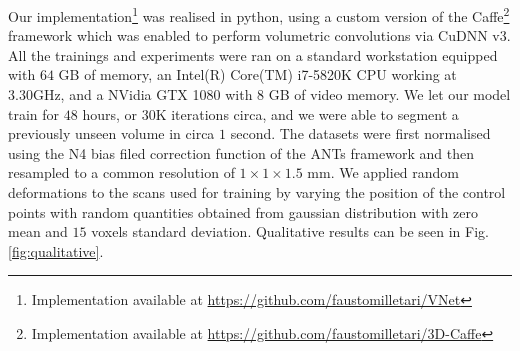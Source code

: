 Our implementation\footnote{Implementation available at \url{https://github.com/faustomilletari/VNet}} was realised in python, using a custom version of the Caffe\footnote{Implementation available at \url{https://github.com/faustomilletari/3D-Caffe}} \cite{jia2014caffe} framework which was enabled to perform volumetric convolutions via CuDNN v3. All the trainings and experiments were ran on a standard workstation equipped with $64$ GB of memory, an Intel(R) Core(TM) i7-5820K CPU working at 3.30GHz, and a NVidia GTX 1080 with $8$ GB of video memory. We let our model train for $48$ hours, or $30$K iterations circa, and we were able to segment a previously unseen volume in circa $1$ second. The datasets were first normalised using the N4 bias filed correction function of the ANTs framework \cite{tustison2010n4itk} and then resampled to a common resolution of $1\times1\times1.5$ mm. We applied random deformations to the scans used for training by varying the position of the control points with random quantities obtained from gaussian distribution with zero mean and $15$ voxels standard deviation. Qualitative results can be seen in Fig. \ref{fig:qualitative}.